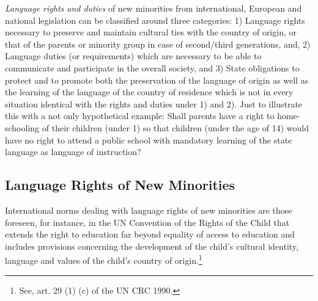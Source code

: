 \documentclass[output=paper,colorlinks,citecolor=brown]{langscibook}
\begin{document}
\textit{Language rights and duties} of new minorities from international, European and national legislation can be classified around three categories: 1) Language rights necessary to preserve and maintain cultural ties with the country of origin, or that of the parents or minority group in case of second/third generations, and, 2) Language duties (or requirements) which are necessary to be able to communicate and participate in the overall society, and 3) State obligations to protect and to promote both the preservation of the language of origin as well as the learning of the language of the country of residence which is not in every situation identical with the rights and duties under 1) and 2). Just to illustrate this with a not only hypothetical example: Shall parents have a right to home-schooling of their children (under 1) so that children (under the age of 14) would have no right to attend a public school with mandatory learning of the state language as language of instruction?

\subsection{Language Rights of New Minorities}\label{ch.2.4.ss.3.1}

International norms dealing with language rights of new minorities are those foreseen, for instance, in the UN Convention of the Rights of the Child that extends the right to education far beyond equality of access to education and includes provisions concerning the development of the child's cultural identity, language and values of the child's country of origin.\footnote{See, art. 29 (1) (c) of the UN CRC 1990.} 
\end{document}
